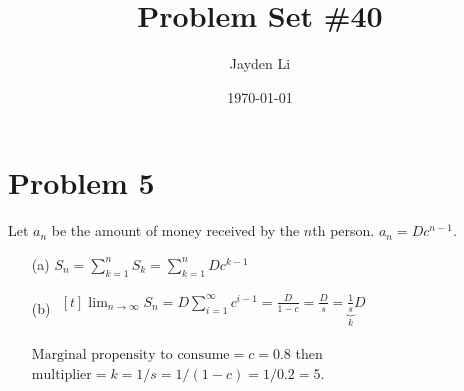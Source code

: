 \documentclass[preview, margin=0.6in]{standalone}
\title{\vspace*{-30pt}Problem Set \#40}
\author{Jayden Li}
\date{\today}
\newcommand*{\problem}[1]{\section*{Problem #1}}
\begin{document}
\fontsize{12pt}{12pt}\selectfont
\setlength{\abovedisplayskip}{0pt}
\setlength{\parindent}{0pt}
\setlength{\parskip}{2ex plus 0.5ex minus 0.2ex}
\maketitle

\problem{5}
Let $a_n$ be the amount of money received by the $n$th person. $a_n=Dc^{n-1}$.
\begin{itemize}
	\item[(a)]
		$\displaystyle S_n=\sum_{k=1}^{n}S_k=\sum_{k=1}^{n}Dc^{k-1}$

	\item[(b)]
		$\begin{aligned}[t]
			\lim_{n\to\infty}S_n
			=D\sum_{i=1}^{\infty}c^{i-1}
			=\frac{D}{1-c}
			=\frac{D}{s}
			=\underbrace{\frac{1}{s}}_{k}D
		\end{aligned}$

		$\text{Marginal propensity to consume}=c=0.8$ then $\text{multiplier}=k=1/s=1/(1-c)=1/0.2=5$.

\end{itemize}
\end{document}
